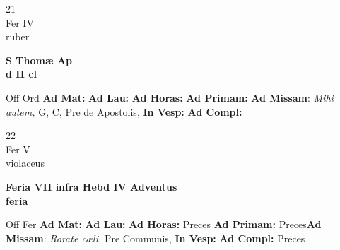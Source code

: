 \documentclass[10pt, openany]{book}
\begin{document}
    \begin{center}
        \begin{minipage}{3.5in}
            \vspace{2em}
            \begin{minipage}{0.5in}
                {\Huge 21} \\
                {\normalsize Fer IV} \\
                {\normalsize ruber}
            \end{minipage}
            \begin{minipage}{3.0in}
                \textbf{ \large S Thomæ Ap \\
                \textnormal{\normalsize d II cl}} \\ 
            \end{minipage}
            \begin{justify}Off Ord
                \textbf{Ad Mat: }
                \textbf{Ad Lau: }
                \textbf{Ad Horas: }
                \textbf{Ad Primam: }\textbf{Ad Missam}: \textit{Mihi autem,} G, C, Pre de Apostolis,  
                \textbf{In Vesp: }
                \textbf{Ad Compl: }
            \end{justify}
        \end{minipage}
    \end{center}

    \begin{center}
        \begin{minipage}{3.5in}
            \vspace{2em}
            \begin{minipage}{0.5in}
                {\Huge 22} \\
                {\normalsize Fer V} \\
                {\normalsize violaceus}
            \end{minipage}
            \begin{minipage}{3.0in}
                \textbf{ \large Feria VII infra Hebd IV Adventus \\
                \textnormal{\normalsize feria}} \\ 
            \end{minipage}
            \begin{justify}Off Fer
                \textbf{Ad Mat: }
                \textbf{Ad Lau: }
                \textbf{Ad Horas: }Preces
                \textbf{Ad Primam: }Preces\textbf{Ad Missam}: \textit{Rorate cæli,} Pre Communis,  
                \textbf{In Vesp: }
                \textbf{Ad Compl: }Preces
            \end{justify}
        \end{minipage}
    \end{center}
\end{document}
